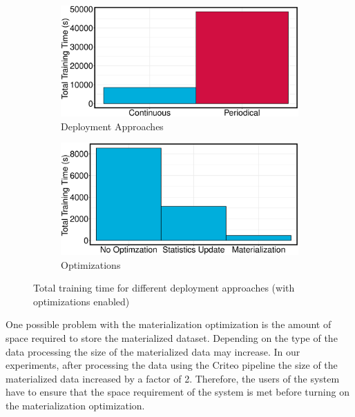 \begin{figure}[h]
\begin{subfigure}{\columnwidth}
\centering
\includegraphics[width=\columnwidth]{../images/experiment-results/criteo-training-time-deployment-types-experiment.eps}
\caption{Deployment Approaches}
\label{fig:training-time-deployment}
\end{subfigure}
\begin{subfigure}{\columnwidth}
\centering
\includegraphics[width=\columnwidth]{../images/experiment-results/criteo-training-time-optimizations-experiment.eps}
\caption{Optimizations}
\label{fig:training-time-optimization}
\end{subfigure}
\vspace{2mm}
\caption{Total training time for different deployment approaches (with optimizations enabled)}
\end{figure}

One possible problem with the materialization optimization is the amount of space required to store the materialized dataset.
Depending on the type of the data processing the size of the materialized data may increase.
In our experiments, after processing the data using the Criteo pipeline the size of the materialized data increased by a factor of 2.
Therefore, the users of the system have to ensure that the space requirement of the system is met before turning on the materialization optimization.



